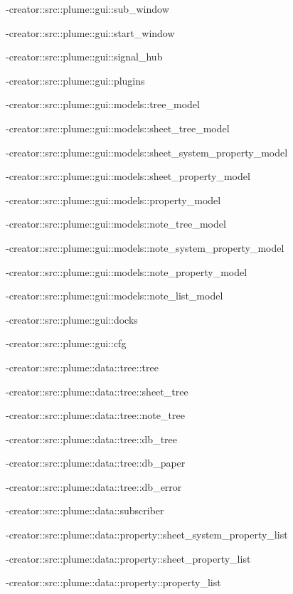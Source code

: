 -\/creator\+::src\+::plume\+::gui\+::sub\+\_\+window

-\/creator\+::src\+::plume\+::gui\+::start\+\_\+window

-\/creator\+::src\+::plume\+::gui\+::signal\+\_\+hub

-\/creator\+::src\+::plume\+::gui\+::plugins

-\/creator\+::src\+::plume\+::gui\+::models\+::tree\+\_\+model

-\/creator\+::src\+::plume\+::gui\+::models\+::sheet\+\_\+tree\+\_\+model

-\/creator\+::src\+::plume\+::gui\+::models\+::sheet\+\_\+system\+\_\+property\+\_\+model

-\/creator\+::src\+::plume\+::gui\+::models\+::sheet\+\_\+property\+\_\+model

-\/creator\+::src\+::plume\+::gui\+::models\+::property\+\_\+model

-\/creator\+::src\+::plume\+::gui\+::models\+::note\+\_\+tree\+\_\+model

-\/creator\+::src\+::plume\+::gui\+::models\+::note\+\_\+system\+\_\+property\+\_\+model

-\/creator\+::src\+::plume\+::gui\+::models\+::note\+\_\+property\+\_\+model

-\/creator\+::src\+::plume\+::gui\+::models\+::note\+\_\+list\+\_\+model

-\/creator\+::src\+::plume\+::gui\+::docks

-\/creator\+::src\+::plume\+::gui\+::cfg

-\/creator\+::src\+::plume\+::data\+::tree\+::tree

-\/creator\+::src\+::plume\+::data\+::tree\+::sheet\+\_\+tree

-\/creator\+::src\+::plume\+::data\+::tree\+::note\+\_\+tree

-\/creator\+::src\+::plume\+::data\+::tree\+::db\+\_\+tree

-\/creator\+::src\+::plume\+::data\+::tree\+::db\+\_\+paper

-\/creator\+::src\+::plume\+::data\+::tree\+::db\+\_\+error

-\/creator\+::src\+::plume\+::data\+::subscriber

-\/creator\+::src\+::plume\+::data\+::property\+::sheet\+\_\+system\+\_\+property\+\_\+list

-\/creator\+::src\+::plume\+::data\+::property\+::sheet\+\_\+property\+\_\+list

-\/creator\+::src\+::plume\+::data\+::property\+::property\+\_\+list

